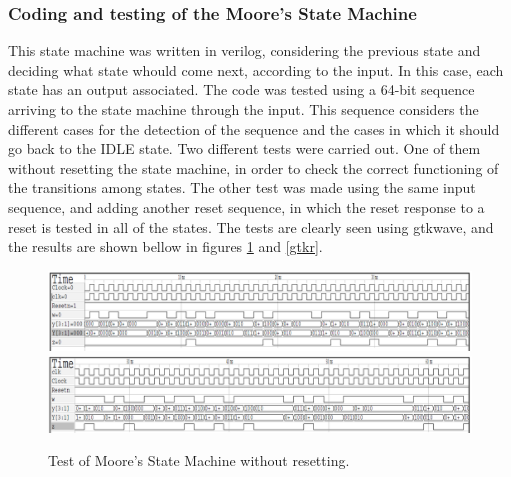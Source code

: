 \subsubsection{\color{orange}Coding and testing of the Moore's State Machine}
This state machine was written in verilog, considering the previous state and deciding what state whould come next, according to the input. In this case, each state has an output associated. The code was tested using a 64-bit sequence arriving to the state machine through the input. This sequence considers the different cases for the detection of the sequence and the cases in which it should go back to the IDLE state. Two different tests were carried out. One of them without resetting the state machine, in order to check the correct functioning of the transitions among states. The other test was made using the same input sequence, and adding another reset sequence, in which the reset response to a reset is tested in all of the states. The tests are clearly seen using gtkwave, and the results are shown bellow in figures \ref{gtk} and \ref{gtkr}.


\begin{figure}[H]
\centering
\includegraphics[scale=0.9]{../Exercise2/Moore/gtk0}\\ 
\includegraphics[scale=0.9]{../Exercise2/Moore/gtk11}
\caption{\color{cyan}Test of Moore's State Machine without resetting.}
\label{gtk}
\end{figure}

